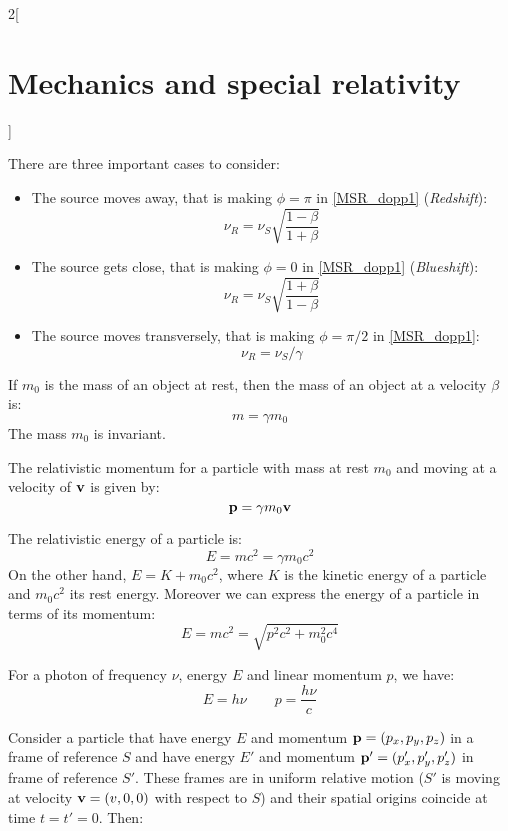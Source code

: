 \documentclass[../../../main.tex]{subfiles}
\begin{document}
\begin{multicols}{2}[\section{Mechanics and special relativity}]
\begin{center}
\begin{minipage}{\linewidth}
    \end{minipage}
  \end{center}
  \begin{corollary}
    There are three important cases to consider:
    \begin{itemize}
      \item The source moves away, that is making $\phi=\pi$ in \cref{MSR_dopp1} (\textit{Redshift}):
            $$\nu_R=\nu_S\sqrt{\frac{1-\beta}{1+\beta}}$$
      \item The source gets close, that is making $\phi=0$ in \cref{MSR_dopp1} (\textit{Blueshift}):
            $$\nu_R=\nu_S\sqrt{\frac{1+\beta}{1-\beta}}$$
      \item The source moves transversely, that is making $\phi=\pi/2$ in \cref{MSR_dopp1}:$$\nu_R=\nu_S/\gamma$$
    \end{itemize}
  \end{corollary}
  \begin{prop}
    If $m_0$ is the mass of an object at rest, then the mass of an object at a velocity $\beta$ is: $$m=\gamma m_0$$ The mass $m_0$ is invariant.
  \end{prop}
  \begin{prop}
    The relativistic momentum for a particle with mass at rest $m_0$ and moving at a velocity of $\boldsymbol{\mathrm{v}}$ is given by: $$\boldsymbol{\mathrm{p}}=\gamma m_0\boldsymbol{\mathrm{v}}$$
  \end{prop}
  \begin{prop}
    The relativistic energy of a particle is: $$E=mc^2=\gamma m_0c^2$$ On the other hand, $E=K+m_0c^2$, where $K$ is the kinetic energy of a particle and $m_0c^2$ its rest energy. Moreover we can express the energy of a particle in terms of its momentum:
    $$E=mc^2=\sqrt{p^2c^2+m_0^2c^4}$$
  \end{prop}
  \begin{prop}
    For a photon of frequency $\nu$, energy $E$ and linear momentum $p$, we have:
    $$E=h\nu\qquad p=\frac{h\nu}{c}$$
  \end{prop}
  \begin{prop}
    Consider a particle that have energy $E$ and momentum $\boldsymbol{\mathrm{p}}=(p_x,p_y,p_z)$ in a frame of reference $S$ and have energy $E'$ and momentum $\boldsymbol{\mathrm{p}}'=(p_x',p_y',p_z')$ in frame of reference $S'$. These frames are in uniform relative motion ($S'$ is moving at velocity $\boldsymbol{\mathrm{v}}=(v,0,0)$ with respect to $S$) and their spatial origins coincide at time $t=t'=0$. Then:

\end{prop}
\end{multicols}
\end{document}
